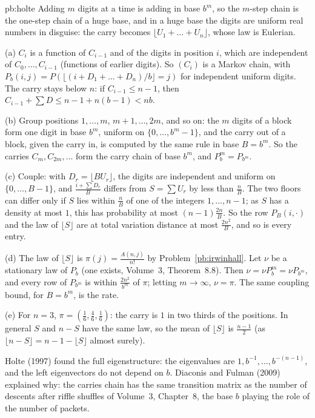 \begin{solution}{pb:holte}
\idea Adding $m$ digits at a time is adding in base $b^m$, so the $m$-step chain is the one-step chain of a huge base, and in a huge base
the digits are uniform real numbers in disguise: the carry becomes $\lfloor U_1+\dots+U_n\rfloor$, whose law is Eulerian.

\writeup (a) $C_i$ is a function of $C_{i-1}$ and of the digits in position $i$, which are independent of $C_0,\dots,C_{i-1}$ (functions of earlier digits). So $(C_i)$ is a
Markov chain, with $P_b(i,j)=P(\lfloor(i+D_1+\dots+D_n)/b\rfloor=j)$ for independent uniform digits. The carry stays below $n$: if $C_{i-1}\le n-1$, then
$C_{i-1}+\sum D\le n-1+n(b-1)<nb$.

(b) Group positions $1,\dots,m$, $m+1,\dots,2m$, and so on: the $m$ digits of a block form one digit in base $b^m$, uniform on $\{0,\dots,b^m-1\}$, and the
carry out of a block, given the carry in, is computed by the same rule in base $B=b^m$. So the carries $C_m,C_{2m},\dots$ form the carry chain of
base $b^m$, and $P_b^m=P_{b^m}$.

(c) Couple: with $D_r=\lfloor BU_r\rfloor$, the digits are independent and uniform on $\{0,\dots,B-1\}$, and $\frac{i+\sum D_r}B$ differs from $S=\sum U_r$ by less than $\frac nB$. The two floors
can differ only if $S$ lies within $\frac nB$ of one of the integers $1,\dots,n-1$; as $S$ has a density at most $1$, this has probability at most $(n-1)\frac{2n}B$. So
the row $P_B(i,\cdot)$ and the law of $\lfloor S\rfloor$ are at total variation distance at most $\frac{2n^2}B$, and so is every entry.

(d) The law of $\lfloor S\rfloor$ is $\pi(j)=\frac{A(n,j)}{n!}$ by Problem~\ref{pb:irwinhall}. Let $\nu$ be a stationary law of $P_b$ (one exists, Volume~3, Theorem~8.8). Then
$\nu=\nu P_b^m=\nu P_{b^m}$, and every row of $P_{b^m}$ is within $\frac{2n^2}{b^m}$ of $\pi$; letting $m\to\infty$, $\nu=\pi$. The same coupling bound, for $B=b^m$, is the rate.

(e) For $n=3$, $\pi=(\frac16,\frac46,\frac16)$: the carry is $1$ in two thirds of the positions. In general $S$ and $n-S$ have the same law, so the mean of $\lfloor S\rfloor$
is $\frac{n-1}2$ (as $\lfloor n-S\rfloor=n-1-\lfloor S\rfloor$ almost surely).

\leads Holte (1997) found the full eigenstructure: the eigenvalues are $1,b^{-1},\dots,b^{-(n-1)}$, and the left eigenvectors do not depend on $b$. Diaconis and
Fulman (2009) explained why: the carries chain has the same transition matrix as the number of descents after riffle shuffles of
Volume~3, Chapter~8, the base $b$ playing the role of the number of packets.
\end{solution}

